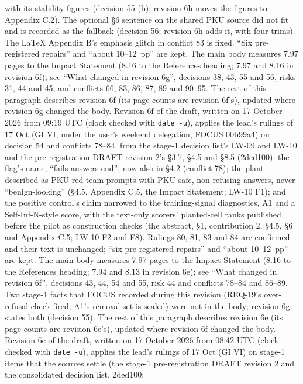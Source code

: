 \documentclass{article}
\theoremstyle{plain}
\theoremstyle{definition}
\theoremstyle{remark}
\begin{document}
with its stability figures (decision 55 (b); revision 6h moves the figures to
Appendix C.2). The optional \S{}6 sentence on the shared PKU source did not fit
and is recorded as the fallback (decision 56; revision 6h adds it, with four
trims). The LaTeX Appendix B's emphasis glitch in conflict 83 is fixed. ``Six
pre-registered repairs'' and ``about 10--12~pp'' are kept. The main body
measures 7.97 pages to the Impact Statement (8.16 to the References heading;
7.97 and 8.16 in revision 6f); see ``What changed in revision 6g'', decisions
38, 43, 55 and 56, risks 31, 44 and 45, and conflicts 66, 83, 86, 87, 89 and
90--95. The rest of this paragraph describes revision 6f (its page counts are
revision 6f's), updated where revision 6g changed the body. Revision 6f of the
draft, written on 17 October 2026 from 09:19 UTC (clock checked with
\texttt{date -u}), applies the lead's rulings of 17 Oct (GI VI, under the user's
weekend delegation, FOCUS 00b99a4) on decision 54 and conflicts 78--84, from the
stage-1 decision list's LW-09 and LW-10 and the pre-registration DRAFT revision
2's \S{}3.7, \S{}4.5 and \S{}8.5 (2ded100): the flag's name, ``fails answers
end'', now also in \S{}4.2 (conflict 78); the plant described as PKU red-team
prompts with PKU-safe, non-refusing answers, never ``benign-looking'' (\S{}4.5,
Appendix C.5, the Impact Statement; LW-10 F1); and the positive control's claim
narrowed to the training-signal diagnostics, A1 and a Self-Inf-N-style score,
with the text-only scorers' planted-cell ranks published before the pilot as
construction checks (the abstract, \S{}1, contribution 2, \S{}4.5, \S{}6 and
Appendix C.5; LW-10 F2 and F8). Rulings 80, 81, 83 and 84 are confirmed and
their text is unchanged; ``six pre-registered repairs'' and ``about 10--12~pp''
are kept. The main body measures 7.97 pages to the Impact Statement (8.16 to the
References heading; 7.94 and 8.13 in revision 6e); see ``What changed in
revision 6f'', decisions 43, 44, 54 and 55, risk 44 and conflicts 78--84 and
86--89. Two stage-1 facts that FOCUS recorded during this revision (REQ-19's
over-refusal check fired; A1's removal set is sealed) were not in the body;
revision 6g states both (decision 55). The rest of this paragraph describes
revision 6e (its page counts are revision 6e's), updated where revision 6f
changed the body. Revision 6e of the draft, written on 17 October 2026 from
08:42 UTC (clock checked with \texttt{date -u}), applies the lead's rulings of
17 Oct (GI VI) on stage-1 items that the sources settle (the stage-1
pre-registration DRAFT revision 2 and the consolidated decision list, 2ded100;
\end{document}
